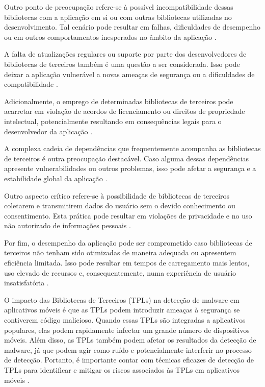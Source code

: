Outro ponto de preocupação refere-se à possível incompatibilidade dessas bibliotecas com a aplicação em si ou com outras bibliotecas utilizadas no desenvolvimento. Tal cenário pode resultar em falhas, dificuldades de desempenho ou em outros comportamentos inesperados no âmbito da aplicação \cite{api_tpl_zhang}.

A falta de atualizações regulares ou suporte por parte dos desenvolvedores de bibliotecas de terceiros também é uma questão a ser considerada. Isso pode deixar a aplicação vulnerável a novas ameaças de segurança ou a dificuldades de compatibilidade \cite{api_tpl_zhang}.

Adicionalmente, o emprego de determinadas bibliotecas de terceiros pode acarretar em violação de acordos de licenciamento ou direitos de propriedade intelectual, potencialmente resultando em consequências legais para o desenvolvedor da aplicação \cite{api_tpl_zhang}.

A complexa cadeia de dependências que frequentemente acompanha as bibliotecas de terceiros é outra preocupação destacável. Caso alguma dessas dependências apresente vulnerabilidades ou outros problemas, isso pode afetar a segurança e a estabilidade global da aplicação \cite{api_tpl_zhang}.

Outro aspecto crítico refere-se à possibilidade de bibliotecas de terceiros coletarem e transmitirem dados do usuário sem o devido conhecimento ou consentimento. Esta prática pode resultar em violações de privacidade e no uso não autorizado de informações pessoais \cite{api_tpl_zhang}.

Por fim, o desempenho da aplicação pode ser comprometido caso bibliotecas de terceiros não tenham sido otimizadas de maneira adequada ou apresentem eficiência limitada. Isso pode resultar em tempos de carregamento mais lentos, uso elevado de recursos e, consequentemente, numa experiência de usuário insatisfatória \cite{api_tpl_zhang}.



O impacto das Bibliotecas de Terceiros (TPLs) na detecção de malware em aplicativos móveis é que as TPLs podem introduzir ameaças à segurança se contiverem código malicioso. Quando essas TPLs são integradas a aplicativos populares, elas podem rapidamente infectar um grande número de dispositivos móveis. Além disso, as TPLs também podem afetar os resultados da detecção de malware, já que podem agir como ruído e potencialmente interferir no processo de detecção. Portanto, é importante contar com técnicas eficazes de detecção de TPLs para identificar e mitigar os riscos associados às TPLs em aplicativos móveis \cite{api_tpl_zhang}.

